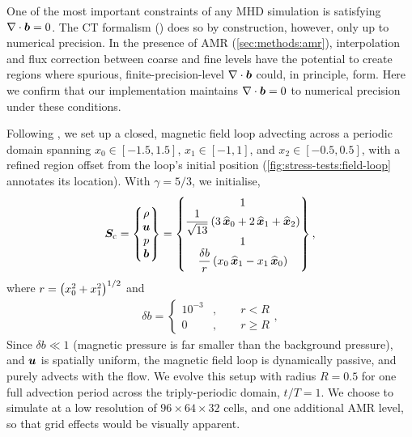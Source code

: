 One of the most important constraints of any MHD simulation is satisfying $\nabla\cdot\bm{b} = 0$. The CT formalism () does so by construction, however, only up to numerical precision. In the presence of AMR (\cref{sec:methods:amr}), interpolation and flux correction between coarse and fine levels have the potential to create regions where spurious, finite-precision-level $\nabla\cdot\bm{b}$ could, in principle, form. Here we confirm that our implementation maintains $\nabla\cdot\bm{b} = 0$ to numerical precision under these conditions.

Following \citet{Gardiner08a}, we set up a closed, magnetic field loop advecting across a periodic domain spanning $x_0 \in [-1.5, 1.5]$, $x_1 \in [-1, 1]$, and $x_2 \in [-0.5, 0.5]$, with a refined region offset from the loop's initial position (\cref{fig:stress-tests:field-loop} annotates its location). With $\gamma = 5/3$, we initialise,
\begin{align}
    \bm{S}_\mathrm{c}
        = \begin{Bmatrix}
                \rho \\
                \bm{u} \\
                p \\
                \bm{b}
            \end{Bmatrix}
        = \begin{Bmatrix}
                1 \\
                \dfrac{1}{\sqrt{13}}\left( 3\,\widehat{\bm{x}}_0 + 2\,\widehat{\bm{x}}_1 + \widehat{\bm{x}}_2 \right) \\
                1 \\
                \dfrac{\delta b}{r}\left( x_0\,\widehat{\bm{x}}_1 - x_1\,\widehat{\bm{x}}_0 \right)
            \end{Bmatrix}
    ,
\end{align}
where $r = \left( x_0^2 + x_1^2 \right)^{1/2}$ and
\begin{align}
    \delta b
        = \begin{cases}
                10^{-3}
                    & , \qquad r < R \\
                0
                    & , \qquad r \geq R
            \end{cases}
    ,
\end{align}
Since $\delta b \ll 1$ (magnetic pressure is far smaller than the background pressure), and $\bm{u}$ is spatially uniform, the magnetic field loop is dynamically passive, and purely advects with the flow. We evolve this setup with radius $R = 0.5$ for one full advection period across the triply-periodic domain, $t / T = 1$. We choose to simulate at a low resolution of $96 \times 64 \times 32$ cells, and one additional AMR level, so that grid effects would be visually apparent.

